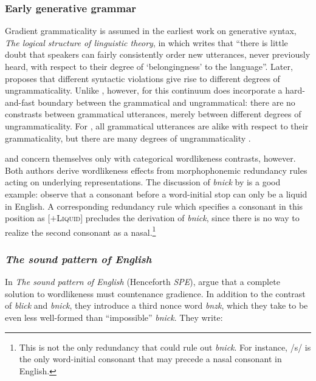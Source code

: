 \subsubsection{Early generative grammar}

Gradient grammaticality is assumed in the earliest work on generative syntax, \emph{The logical structure of linguistic theory}, in which \citet[132]{LSLT} writes that ``there is little doubt that speakers can fairly consistently order new utterances, never previously heard, with respect to their degree of `belongingness' to the language''. Later, \citet{ASPECTS} proposes that different syntactic violations give rise to different degrees of ungrammaticality. Unlike \citeauthor{Fischer-Jorgensen1952}, however, for \citeauthor{LSLT} this continuum does incorporate a hard-and-fast boundary between the grammatical and ungrammatical: there are no constrasts between grammatical utterances, merely between different degrees of ungrammaticality. For \citeauthor{LSLT}, all grammatical utterances are alike with respect to their grammaticality, but there are many degrees of ungrammaticality \citep[61]{Schutze1996}.

\citet{Halle1962} and \citet{Stanley1967} concern themselves only with categorical wordlikeness contrasts, however. Both authors derive wordlikeness effects from morphophonemic redundancy rules acting on underlying representations. The discussion of \emph{bnick} by \citet[101]{Chomsky1965} is a good example: \citeauthor{Chomsky1965} observe that a consonant before a word-initial stop can only be a liquid in English. A corresponding redundancy rule which specifies a consonant in this position as [$+$\textsc{Liquid}] precludes the derivation of \emph{bnick}, since there is no way to realize the second consonant as a nasal.\footnote{This is not the only redundancy that could rule out \emph{bnick}. For instance, /s/ is the only word-initial consonant that may precede a nasal consonant in English.}

\subsubsection{\emph{The sound pattern of English}} \label{2spe}

In \emph{The sound pattern of English} (Henceforth \emph{SPE}), \citet{SPE} argue that a complete solution to wordlikeness must countenance gradience. In addition to the contrast of \emph{blick} and \emph{bnick}, they introduce a third nonce word \emph{bnzk}, which they take to be even less well-formed than ``impossible'' \emph{bnick}. They write:

